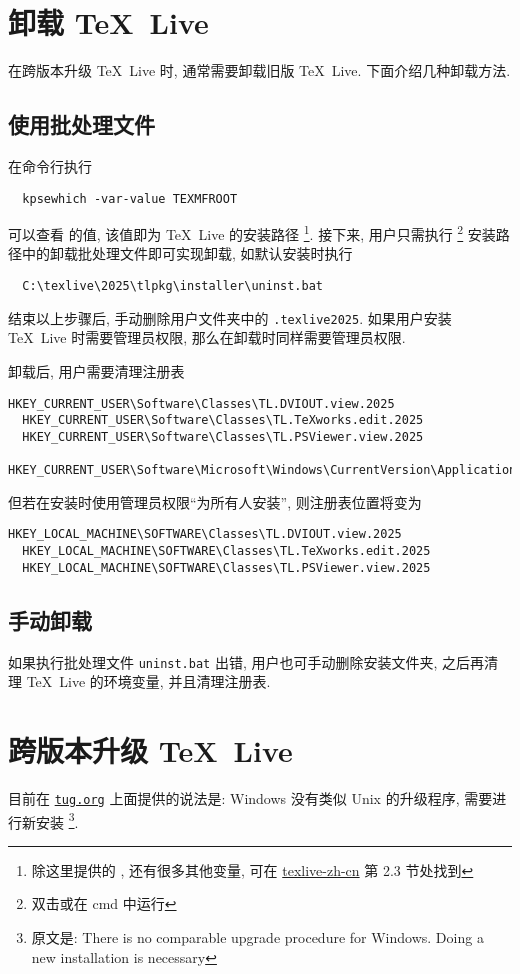 \section{卸载 \TeX~Live}

在跨版本升级 \TeX~Live 时, 通常需要卸载旧版 \TeX~Live.
下面介绍几种卸载方法.

\subsection{使用批处理文件}

在命令行执行
\begin{lstlisting}
  kpsewhich -var-value TEXMFROOT
\end{lstlisting}
可以查看  的值,
该值即为 \TeX~Live 的安装路径%
\footnote{除这里提供的 , 还有很多其他变量, 可在
\href{https://www.tug.org/texlive/doc/texlive-zh-cn/texlive-zh-cn.pdf}{texlive-zh-cn}
第 2.3 节处找到}.
接下来,
用户只需执行%
\footnote{双击或在 \textsf{cmd} 中运行}%
安装路径中的卸载批处理文件即可实现卸载, 如默认安装时执行
\begin{lstlisting}
  C:\texlive\2025\tlpkg\installer\uninst.bat
\end{lstlisting}
结束以上步骤后,
手动删除用户文件夹中的 \texttt{.texlive2025}.
如果用户安装 \TeX~Live 时需要管理员权限,
那么在卸载时同样需要管理员权限.

卸载后,
用户需要清理注册表
\begin{lstlisting}[language = {}]
  HKEY_CURRENT_USER\Software\Classes\TL.DVIOUT.view.2025
  HKEY_CURRENT_USER\Software\Classes\TL.TeXworks.edit.2025
  HKEY_CURRENT_USER\Software\Classes\TL.PSViewer.view.2025
  HKEY_CURRENT_USER\Software\Microsoft\Windows\CurrentVersion\ApplicationAssociationToasts\TL.TeXworks.edit.2025_.tex
\end{lstlisting}
但若在安装时使用管理员权限``为所有人安装'',
则注册表位置将变为
\begin{lstlisting}[language = {}]
  HKEY_LOCAL_MACHINE\SOFTWARE\Classes\TL.DVIOUT.view.2025
  HKEY_LOCAL_MACHINE\SOFTWARE\Classes\TL.TeXworks.edit.2025
  HKEY_LOCAL_MACHINE\SOFTWARE\Classes\TL.PSViewer.view.2025
\end{lstlisting}

\subsection{手动卸载}

如果执行批处理文件 \texttt{uninst.bat} 出错,
用户也可手动删除安装文件夹,
之后再清理 \TeX~Live 的环境变量,
并且清理注册表.

\section{跨版本升级 \TeX~Live}

目前在 \href{https://www.tug.org/texlive/upgrade.html}{\texttt{tug.org}}
上面提供的说法是:
Windows 没有类似 Unix 的升级程序,
需要进行新安装%
\footnote{原文是: There is no comparable upgrade procedure for Windows.
Doing a new installation is necessary}.
